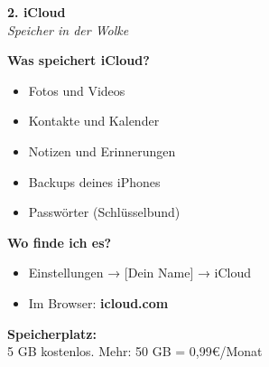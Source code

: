 \documentclass[a4paper,landscape,8pt]{extarticle}
\begin{document}
\hfill%
\begin{minipage}[t]{0.32\linewidth}
\begin{center}
\colorbox{icloudblue!15}{%
\begin{minipage}{0.95\linewidth}
\vspace{2mm}
\begin{center}
{\Large\bfseries\textcolor{icloudblue}{2. iCloud}}\\[1pt]
{\footnotesize\itshape Speicher in der Wolke}
\end{center}
\vspace{2mm}
\end{minipage}%
}
\end{center}

\vspace{1mm}

\textbf{Was speichert iCloud?}
\begin{itemize}
\item Fotos und Videos
\item Kontakte und Kalender
\item Notizen und Erinnerungen
\item Backups deines iPhones
\item Passwörter (Schlüsselbund)
\end{itemize}

\textbf{Wo finde ich es?}
\begin{itemize}
\item Einstellungen → [Dein Name] → iCloud
\item Im Browser: \textbf{icloud.com}
\end{itemize}

\textbf{Speicherplatz:}\\
5 GB kostenlos. Mehr: 50 GB = 0,99\euro{}/Monat

\vspace{2mm}

\end{minipage}%
\hfill%
\end{document}
